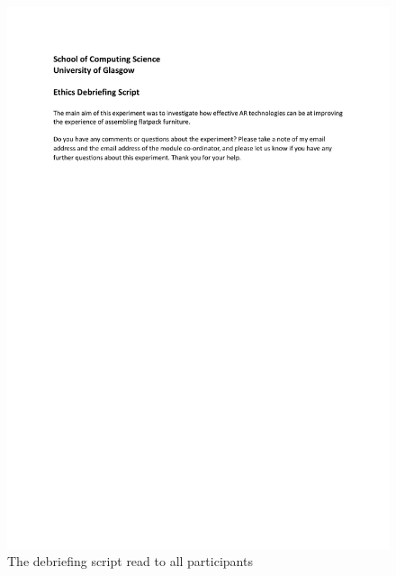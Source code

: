 \documentclass{l4proj}
\begin{document}
\begin{appendices}
\begin{figure}
    \centering
    \includegraphics[width=1\linewidth]{dissertation//images/debriefingScript.pdf}
    \caption{The debriefing script read to all participants}
\end{figure}


\end{appendices}
\end{document}
